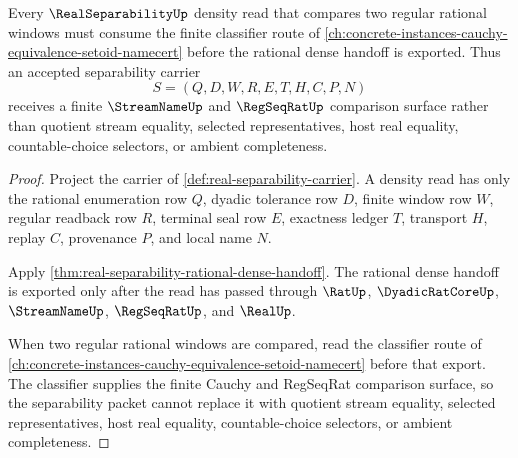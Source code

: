 \begin{theorem}
\label{thm:real-separability-cauchy-equivalence-setoid-forward-consumption}
Every $\RealSeparabilityUp$ density read that compares two regular rational windows must consume the finite classifier route of \autoref{ch:concrete-instances-cauchy-equivalence-setoid-namecert} before the rational dense handoff is exported. Thus an accepted separability carrier
$$
S=(Q,D,W,R,E,T,H,C,P,N)
$$
receives a finite $\StreamNameUp$ and $\RegSeqRatUp$ comparison surface rather than quotient stream equality, selected representatives, host real equality, countable-choice selectors, or ambient completeness.
\end{theorem}
\begin{proof}
Project the carrier of \autoref{def:real-separability-carrier}. A density read has only the rational enumeration row $Q$, dyadic tolerance row $D$, finite window row $W$, regular readback row $R$, terminal seal row $E$, exactness ledger $T$, transport $H$, replay $C$, provenance $P$, and local name $N$.

Apply \autoref{thm:real-separability-rational-dense-handoff}. The rational dense handoff is exported only after the read has passed through $\RatUp$, $\DyadicRatCoreUp$, $\StreamNameUp$, $\RegSeqRatUp$, and $\RealUp$.

When two regular rational windows are compared, read the classifier route of \autoref{ch:concrete-instances-cauchy-equivalence-setoid-namecert} before that export. The classifier supplies the finite Cauchy and RegSeqRat comparison surface, so the separability packet cannot replace it with quotient stream equality, selected representatives, host real equality, countable-choice selectors, or ambient completeness.
\end{proof}


